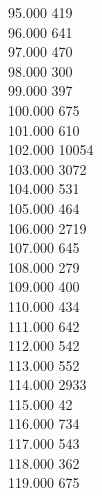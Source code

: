 { 95.000	419 \\
 96.000	641 \\
 97.000	470 \\
 98.000	300 \\
 99.000	397 \\
 100.000	675 \\
 101.000	610 \\
 102.000	10054 \\
 103.000	3072 \\
 104.000	531 \\
 105.000	464 \\
 106.000	2719 \\
 107.000	645 \\
 108.000	279 \\
 109.000	400 \\
 110.000	434 \\
 111.000	642 \\
 112.000	542 \\
 113.000	552 \\
 114.000	2933 \\
 115.000	42 \\
 116.000	734 \\
 117.000	543 \\
 118.000	362 \\
 119.000	675 \\
}
